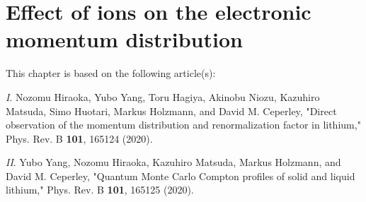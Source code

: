 \chapter{Effect of ions on the electronic momentum distribution} \label{chap:licp}
This chapter is based on the following article(s):

\textit{I}. Nozomu Hiraoka, Yubo Yang, Toru Hagiya, Akinobu Niozu, Kazuhiro Matsuda, Simo Huotari, Markus Holzmann, and David M. Ceperley, "Direct observation of the momentum distribution and renormalization factor in lithium," Phys. Rev. B \textbf{101}, 165124 (2020).

\textit{II}. Yubo Yang, Nozomu Hiraoka, Kazuhiro Matsuda, Markus Holzmann, and David M. Ceperley, "Quantum Monte Carlo Compton profiles of solid and liquid lithium," Phys. Rev. B \textbf{101}, 165125 (2020).


%